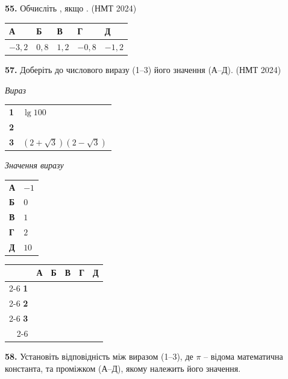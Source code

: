 \documentclass[14pt]{extarticle}
\newcommand{\answerGrid}{
    \begingroup
    \renewcommand{\arraystretch}{1.3} 
    \setlength{\tabcolsep}{7pt} 
    \begin{tabular}{r|c|c|c|c|c|}
         \multicolumn{1}{c}{} & \multicolumn{1}{c}{\textbf{А}} & \multicolumn{1}{c}{\textbf{Б}} & \multicolumn{1}{c}{\textbf{В}} & \multicolumn{1}{c}{\textbf{Г}} & \multicolumn{1}{c}{\textbf{Д}} \\ \cline{2-6}
         \textbf{1} & & & & & \\ \cline{2-6}
         \textbf{2} & & & & & \\ \cline{2-6}
         \textbf{3} & & & & & \\ \cline{2-6}
    \end{tabular}
    \endgroup
}
\newcommand{\matchingLayout}[3]{
    \noindent
    \begin{minipage}[t]{0.40\textwidth}
       
        #1
    \end{minipage}%
    \hfill
    \begin{minipage}[t]{0.28\textwidth}
        
        #2
    \end{minipage}%
    \hfill
    \begin{minipage}[t]{0.30\textwidth}
        \vspace{0pt} %
        \begin{flushright}
        #3
        \end{flushright}
    \end{minipage}
}
\newcommand{\answerTable}[5]{
\begin{center}
\begin{tabular}{|*{5}{>{\centering\arraybackslash}m{2.8cm}|}}
\hline
\rule[-0.3cm]{0pt}{0.8cm}\textbf{А} & \textbf{Б} & \textbf{В} & \textbf{Г} & \textbf{Д} \\
\hline
\rule[-0.4cm]{0pt}{1.0cm}#1 & \rule[-0.4cm]{0pt}{1.0cm}#2 & \rule[-0.4cm]{0pt}{1.0cm}#3 & \rule[-0.4cm]{0pt}{1.0cm}#4 & \rule[-0.4cm]{0pt}{1.0cm}#5 \\
\hline
\end{tabular}
\end{center}
}
\newcommand{\nmtyear}[1]{\hfill{\small\color{yearcolor}(НМТ #1)}}
\begin{document}
\vspace{0.7cm}

\noindent\textbf{55.} Обчисліть , якщо . \nmtyear{2024}


\vspace{0.3cm}
\answerTable{$-3{,}2$}{$0{,}8$}{$1{,}2$}{$-0{,}8$}{$-1{,}2$}

\vspace{0.7cm}

\noindent\textbf{57.} Доберіть до числового виразу (1--3) його значення (А--Д). \nmtyear{2024}


\vspace{0.3cm}

\matchingLayout{
    \textit{Вираз} \par \vspace{0.2cm}
    \begin{tabular}{@{}p{0.5cm} l@{}}
    \textbf{1} & $\lg 100$ \\[0.4cm]
    \textbf{2} & \trigStyle{$\sin \dfrac{3\pi}{2}$} \\[0.6cm]
    \textbf{3} & $(2 + \sqrt{3})(2 - \sqrt{3})$ \\
    \end{tabular}
}{
    \textit{Значення виразу} \par \vspace{0.2cm}
    \begin{tabular}{@{}p{0.5cm} l@{}}
    \textbf{А} & $-1$ \\[0.2cm]
    \textbf{Б} & $0$ \\[0.2cm]
    \textbf{В} & $1$ \\[0.2cm]
    \textbf{Г} & $2$ \\[0.2cm]
    \textbf{Д} & $10$ \\
    \end{tabular}
}{
    \answerGrid
}

\vspace{0.7cm}

\noindent\textbf{58.} Установіть відповідність між виразом (1--3), де $\pi$ -- відома математична константа, та проміжком (А--Д), якому належить його значення.

\vspace{0.3cm}
\end{document}
